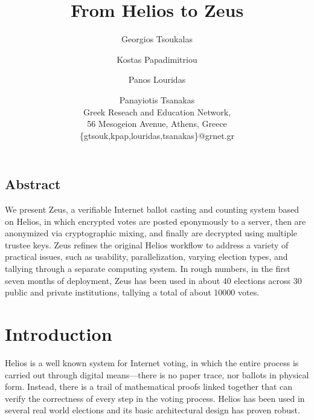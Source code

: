 \documentclass[letterpaper,10pt]{article}
\begin{document}
\date{}

\title{\Large \bf From Helios to Zeus}

\author{
{\rm Georgios Tsoukalas}\\
\and 
{\rm Kostas Papadimitriou}\\
\and 
{\rm Panos Louridas}\\
\and 
{\rm Panayiotis Tsanakas}\\
Greek Reseach and Education Network,\\
56 Mesogeion Avenue, Athens, Greece\\
\{gtsouk,kpap,louridas,tsanakas\}@grnet.gr
}

\maketitle

\thispagestyle{empty}

\subsection*{Abstract}

We present Zeus, a verifiable Internet ballot casting and counting
system based on Helios, in which encrypted votes are posted eponymously
to a server, then are anonymized via cryptographic mixing, and
finally are decrypted using multiple trustee keys. Zeus refines the
original Helios workflow to address a variety of practical issues, such
as usability, parallelization, varying election types, and tallying
through a separate computing system.
In rough numbers, in the first seven months of deployment, Zeus has been
used in about 40 elections across 30 public and private institutions,
tallying a total of about 10000 votes.


\section{Introduction}

Helios \cite{adida:2008} \cite{Helios3} is a well known system for
Internet voting, in which the entire process is carried out through
digital means---there is no paper trace, nor ballots in physical form.
Instead, there is a trail of mathematical proofs linked together that
can verify the correctness of every step in the voting process.
Helios has been used in several real world elections and its basic
architectural design has proven robust.
\end{document}
